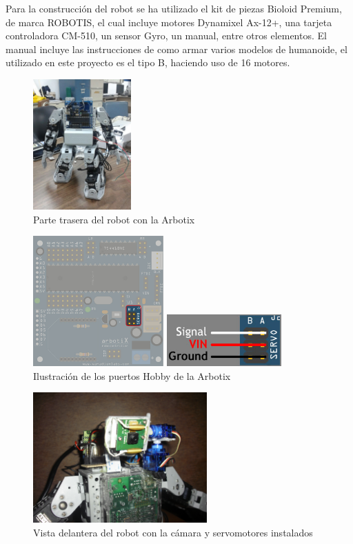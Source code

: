 \documentclass[tikz,conference, letterpaper]{IEEEtranMC1}
\begin{document}
Para la construcción del robot se ha utilizado el kit de piezas Bioloid Premium, de marca ROBOTIS, el cual incluye motores Dynamixel Ax-12+, una tarjeta controladora CM-510, un sensor Gyro, un manual, entre otros elementos. El manual incluye las instrucciones de como armar varios modelos de humanoide, el utilizado en este proyecto es el tipo B, haciendo uso de 16 motores. 
\begin{figure}[ht!]
	\centering
		\includegraphics[height=05cm]{arbotixsola.jpg}
	\caption{  Parte trasera del robot con la Arbotix}
	\label{fig:figura1}
\end{figure}
\begin{figure}[ht!]
	\centering
		\includegraphics[height=05cm]{arbotix_hobby_servo.jpg}
		
    	\includegraphics[height=2cm]{arbotix_hobbyservos_lines.jpg}
	\caption{  Ilustración de los puertos Hobby de la Arbotix
}
	\label{fig:figura2}
\end{figure}

\begin{figure}[ht!]
	\centering
		\includegraphics[height=05cm]{CIMG0025.JPG} 	
	\caption{ Vista delantera del robot con la cámara y servomotores instalados}
	\label{fig:figura3}
\end{figure}
\end{document}
